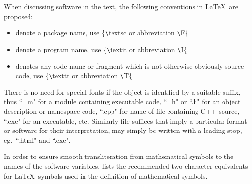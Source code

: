 
When discussing software in the text, the following conventions in \LaTeX\  are proposed:
\begin{itemize}
\item {} denote a package name, use \{\verb-\-textsc or abbreviation \verb-\-F\{
\item {} denote a program name, use \{\verb-\-textit or abbreviation \verb-\-I\{
\item {} denotes any code name or fragment which is not otherwise obviously source code,
use \{\verb-\-texttt or abbreviation \verb-\-T\{
\end{itemize}
There is no need for special fonts if the object is identified by a
suitable suffix, thus ``\_m" for a module containing executable code,
``\_h" or ``.h" for an object description or namespace code, ``.cpp" for name of file containing
C++ source, ``.exe" for an executable, etc. Similarly file suffices that imply a particular
format or software for their interpretation, may simply be written with a leading stop,
eg.\ ``.html" and ``.exe".

In order to ensure smooth transliteration from mathematical symbols to the names
of the software variables,  lists the recommended two-character
equivalents for \LaTeX \ symbols used in the definition of mathematical symbols.

